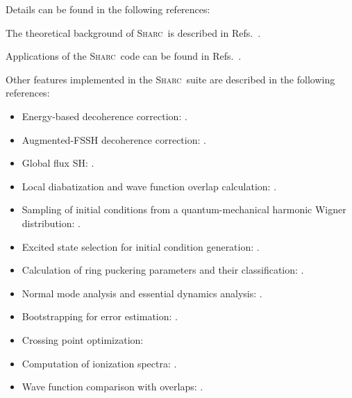 \documentclass[a4paper,10pt,DIV=15,openany]{scrbook}
\newcommand{\sharc}{\textsc{Sharc}}
\begin{document}
Details can be found in the following references:

The theoretical background of \sharc\ is described in Refs.~\cite{Richter2011JCTC, Richter2012JCTC_erratum, Bajo2012JPCA, Marquetand2011FD, Mai2015IJQC, Mai2018WCMS, Mai2018}.

Applications of the \sharc\ code can be found in Refs.~\cite{Richter2012JPCL, Mai2013C, Mai2014TCC, Mai2014JCP_SO2, Gonzalez2014, Richter2014PCCP,Martinez-Fernandez2014JCTC, Corrales2014PCCP, Crespo-Hernandez2015JACS, Marazzi2016JPCL, Richter2016JCTC, Cao2016CP, Banerjee2016PCCP, Mai2016JPCL, Mai2016NC, Peccati2016PTRSA, Murillo-Sanchez2017CPL, Borin2017PCCP, Mai2017CP, Siouri2017JPCA, Bellshaw2017CPL, Sun2017JPCA, Rauer2016JACS, Atkins2017JPCL, Schnappinger2017PCCP, Mai2017JCP, Zobel2018CEJ, Rauer2018MC, Cao2018JMS, Squibb2018NC}.

Other features implemented in the \sharc\ suite are described in the following references:
\begin{itemize}
  \item Energy-based decoherence correction: \cite{Granucci2007JCP}.
  \item Augmented-FSSH decoherence correction: \cite{Jain2016JCTC}.
  \item Global flux SH: \cite{Wang2014JCTC}.
  \item Local diabatization and wave function overlap calculation: \cite{Granucci2001JCP, Plasser2012JCP, Plasser2016JCTC}.
  \item Sampling of initial conditions from a quantum-mechanical harmonic Wigner distribution: \cite{Dahl1988JCP, Schinke1995, Barbatti2016IJQC}.
  \item Excited state selection for initial condition generation: \cite{Barbatti2007JPPA}.
  \item Calculation of ring puckering parameters and their classification: \cite{Cremer1975JACS, Boeyens1976JCMS}.
  \item Normal mode analysis \cite{Kurtz2001JCP,Plasser2009} and essential dynamics analysis: \cite{Amadei1993PSFB,Plasser2009}.
  \item Bootstrapping for error estimation: \cite{Nangia2004JCP}.
  \item Crossing point optimization: \cite{Bearpark1994CPL, Levine2008JPCB}
  \item Computation of ionization spectra: \cite{Ruckenbauer2016SR,Ruckenbauer2016JCP}.
  \item Wave function comparison with overlaps: \cite{Plasser2016JCP}.
\end{itemize}
\end{document}
